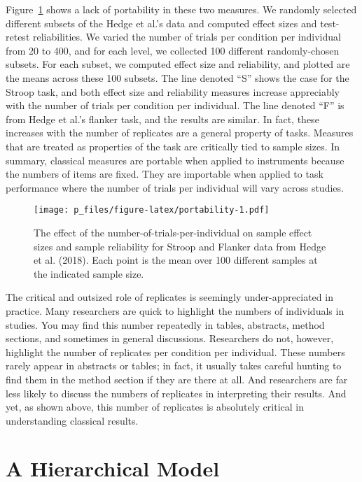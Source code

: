 \documentclass[english,man]{apa6}
\theoremstyle{definition}
\theoremstyle{definition}
\theoremstyle{definition}
\theoremstyle{remark}
\begin{document}
Figure~\ref{fig:portability} shows a lack of portability in these two
measures. We randomly selected different subsets of the Hedge et al.'s
data and computed effect sizes and test-retest reliabilities. We varied
the number of trials per condition per individual from 20 to 400, and
for each level, we collected 100 different randomly-chosen subsets. For
each subset, we computed effect size and reliability, and plotted are
the means across these 100 subsets. The line denoted \enquote{S} shows
the case for the Stroop task, and both effect size and reliability
measures increase appreciably with the number of trials per condition
per individual. The line denoted \enquote{F} is from Hedge et al.'s
flanker task, and the results are similar. In fact, these increases with
the number of replicates are a general property of tasks. Measures that
are treated as properties of the task are critically tied to sample
sizes. In summary, classical measures are portable when applied to
instruments because the numbers of items are fixed. They are importable
when applied to task performance where the number of trials per
individual will vary across studies.

\begin{figure}[htbp]
\centering
\texttt{[image: p\_files/figure-latex/portability-1.pdf]}
\caption{\label{fig:portability}The effect of the
number-of-trials-per-individual on sample effect sizes and sample
reliability for Stroop and Flanker data from Hedge et al. (2018). Each
point is the mean over 100 different samples at the indicated sample
size.}
\end{figure}

The critical and outsized role of replicates is seemingly
under-appreciated in practice. Many researchers are quick to highlight
the numbers of individuals in studies. You may find this number
repeatedly in tables, abstracts, method sections, and sometimes in
general discussions. Researchers do not, however, highlight the number
of replicates per condition per individual. These numbers rarely appear
in abstracts or tables; in fact, it usually takes careful hunting to
find them in the method section if they are there at all. And
researchers are far less likely to discuss the numbers of replicates in
interpreting their results. And yet, as shown above, this number of
replicates is absolutely critical in understanding classical results.

\section{A Hierarchical Model}\label{a-hierarchical-model}
\end{document}
